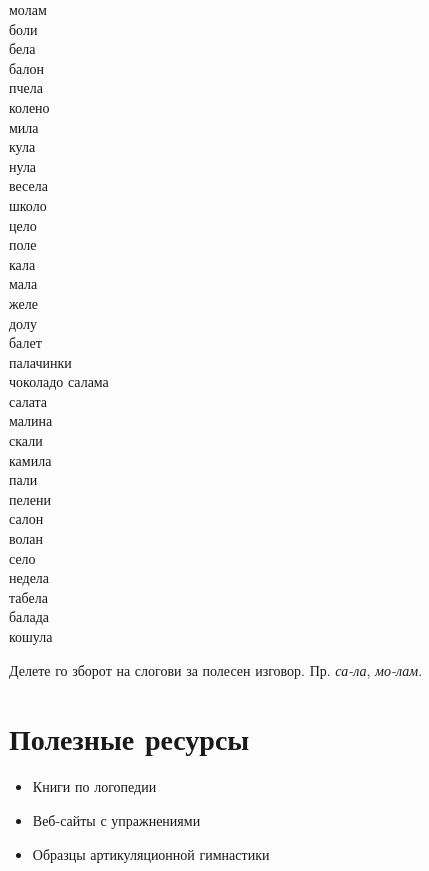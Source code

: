 \documentclass[a5paper,12pt]{article}
\newenvironment{activity}[1]{%
  \begin{tcolorbox}[colback=boxcolor,colframe=titlecolor,title={\textbf{#1}},fonttitle=\bfseries]
}{%
  \end{tcolorbox}
}
\newenvironment{instruction}{%
  \begin{tcolorbox}[colback=white,colframe=accentcolor,title={\textbf{Инструкции}},fonttitle=\bfseries] 
}{%
  \end{tcolorbox}
}
\begin{document}
\begin{activity}{Зборчиња}
  \begin{multicols}{4}
молам\\ боли\\ бела\\ балон\\ пчела\\ колено\\ мила\\ кула\\ нула\\ весела\\ школо\\ цело\\ поле\\ кала\\ мала\\ желе\\ долу\\ балет\\ палачинки\\ чоколадо
салама\\ салата\\ малина\\ скали\\ камила\\ пали\\ пелени\\ салон\\ волан\\ село\\ недела\\ табела\\ балада\\ кошула
\end{multicols}
\end{activity}

\begin{instruction}
  Делете го зборот на слогови за полесен изговор. Пр. \emph{са-ла}, \emph{мо-лам}.
\end{instruction}

\appendix
\section{Полезные ресурсы} 
\begin{itemize}
  \item Книги по логопедии
  \item Веб-сайты с упражнениями
  \item Образцы артикуляционной гимнастики
\end{itemize}

\end{document}
